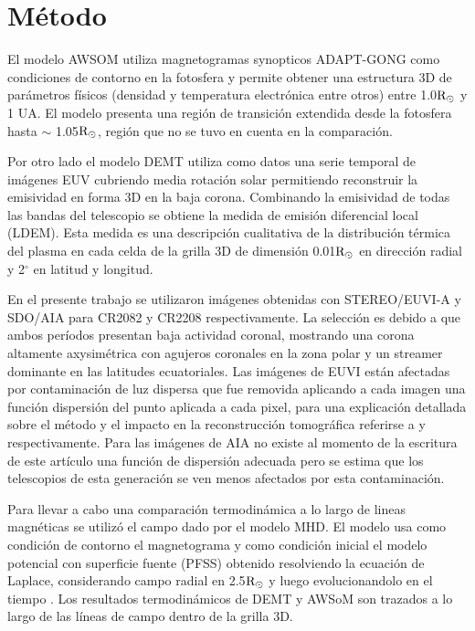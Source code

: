 \documentclass[baaa]{baaa}
\begin{document}
\section{Método}

El modelo AWSOM utiliza magnetogramas synopticos ADAPT-GONG \citep{arge_2010} como condiciones de contorno en la fotosfera y permite obtener una estructura 3D de parámetros físicos (densidad y temperatura electrónica entre otros) entre 1.0${\rm R_\odot}$ y 1 UA. El modelo presenta una región de transición extendida desde la fotosfera hasta $\sim$ 1.05${\rm R_\odot}$, región que no se tuvo en cuenta en la comparación.

Por otro lado el modelo DEMT utiliza como datos una serie temporal de imágenes EUV cubriendo media rotación solar permitiendo reconstruir la emisividad en forma 3D en la baja corona. Combinando la emisividad de todas las bandas del telescopio se obtiene la \rm{medida de emisión diferencial local} (LDEM). Esta medida es una descripción cualitativa de la distribución térmica del plasma en cada celda de la grilla 3D de dimensión 0.01${\rm R_\odot}$ en dirección radial y 2$^{\circ}$ en latitud y longitud.

En el presente trabajo se utilizaron imágenes obtenidas con STEREO/EUVI-A y SDO/AIA para CR2082 y CR2208 respectivamente. La selección es debido a que ambos períodos presentan baja actividad coronal, mostrando una corona altamente axysimétrica con agujeros coronales en la zona polar y un streamer dominante en las latitudes ecuatoriales. Las imágenes de EUVI están afectadas por \rm{contaminación de luz dispersa} que fue removida aplicando a cada imagen una \rm{función dispersión del punto} aplicada a cada pixel, para una explicación detallada sobre el método y el impacto en la reconstrucción tomográfica referirse a \citet{shearer_2012} y \citet{lloveras_ba2017} respectivamente. Para las imágenes de AIA no existe al momento de la escritura de este artículo una función de dispersión adecuada pero se estima que los telescopios de esta generación se ven menos afectados por esta contaminación.

Para llevar a cabo una comparación termodinámica a lo largo de lineas magnéticas se utilizó el campo dado por el modelo MHD. El modelo usa como condición de contorno el magnetograma y como condición inicial el modelo potencial con superficie fuente (PFSS) obtenido resolviendo la ecuación de Laplace, considerando campo radial en 2.5${\rm R_\odot}$ y luego evolucionandolo en el tiempo \citep{vander_2010}. Los resultados termodinámicos de DEMT y AWSoM son trazados a lo largo de las líneas de campo dentro de la grilla 3D. 
\end{document}
